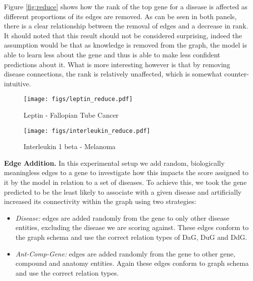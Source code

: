 Figure \ref{fig:reduce} shows how the rank of the top gene for a disease is affected as different proportions of its edges are removed. As can be seen in both panels, there is a clear relationship between the removal of edges and a decrease in rank. It should noted that this result should not be considered surprising, indeed the assumption would be that as knowledge is removed from the graph, the model is able to learn less about the gene and thus is able to make less confident predictions about it. What is more interesting however is that by removing disease connections, the rank is relatively unaffected, which is somewhat counter-intuitive.

\begin{figure*}[!ht]
	\centering
	\begin{subfigure}[b]{0.48\textwidth}
		\centering
		\texttt{[image: figs/leptin\_reduce.pdf]}
		\caption{Leptin - Fallopian Tube Cancer}\label{fig:reduce:lep}
	\end{subfigure}
	\begin{subfigure}[b]{0.48\textwidth}
		\centering
		\texttt{[image: figs/interleukin\_reduce.pdf]}
		\caption{Interleukin 1 beta - Melanoma}\label{fig:reduce:inter}
	\end{subfigure}
	\caption{Removel of edges from the top ranked novel gene for two diseases: Fallopian Tube Cancer and Melanoma}
	\label{fig:reduce}
\end{figure*}

\textbf{Edge Addition.} In this experimental setup we add random, biologically meaningless edges to a gene to investigate how this impacts the score assigned to it by the model in relation to a set of diseases. To achieve this, we took the gene predicted to be the least likely to associate with a given disease and artificially increased its connectivity within the graph using two strategies:

\begin{itemize}
	\item \emph{Disease:} edges are added randomly from the gene to only other disease entities, excluding the disease we are scoring against. These edges conform to the graph schema and use the correct relation types of DaG, DuG and DdG.
	\item \emph{Ant-Comp-Gene:} edges are added randomly from the gene to other gene, compound and anatomy entities. Again these edges conform to graph schema and use the correct relation types.
\end{itemize}

